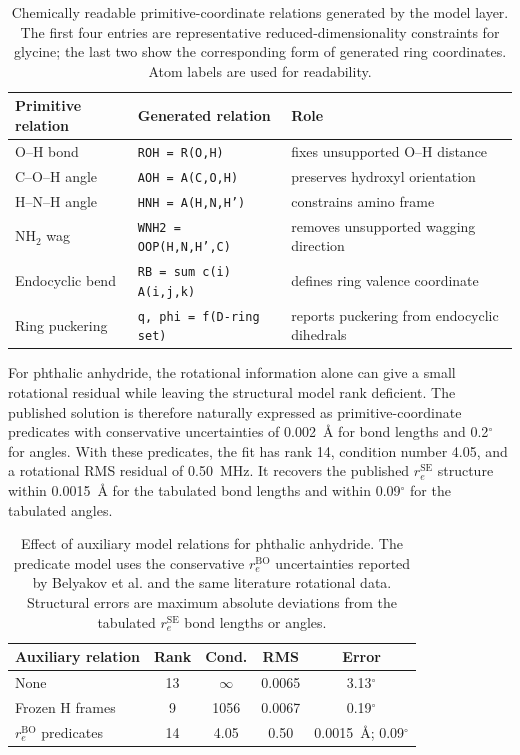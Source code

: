 \documentclass[aip,jcp,reprint,longbibliography,floatfix]{revtex4-2}
\begin{document}
\begin{table}[t]
\caption{Chemically readable primitive-coordinate relations generated by the
model layer. The first four entries are representative reduced-dimensionality
constraints for glycine; the last two show the corresponding form of generated
ring coordinates. Atom labels are used for readability.}
\label{tab:generated-relation-example}
\scriptsize
\setlength{\tabcolsep}{4pt}
\begin{tabular}{@{}lll@{}}
\toprule
Primitive relation & Generated relation & Role \\
\midrule
O--H bond & \texttt{ROH = R(O,H)} & fixes unsupported O--H distance \\
C--O--H angle & \texttt{AOH = A(C,O,H)} & preserves hydroxyl orientation \\
H--N--H angle & \texttt{HNH = A(H,N,H')} & constrains amino frame \\
NH$_2$ wag & \texttt{WNH2 = OOP(H,N,H',C)} & removes unsupported wagging direction \\
Endocyclic bend & \texttt{RB = sum c(i) A(i,j,k)} & defines ring valence coordinate \\
Ring puckering & \texttt{q, phi = f(D-ring set)} & reports puckering from endocyclic dihedrals \\
\bottomrule
\end{tabular}
\end{table}

For phthalic anhydride, the rotational information alone can give a small
rotational residual while leaving the structural model rank deficient. The
published solution is therefore naturally expressed as primitive-coordinate
predicates with conservative uncertainties of 0.002~\AA{} for bond lengths and
0.2$^\circ$ for angles. With these predicates, the fit has
rank 14, condition number 4.05, and a rotational RMS residual of 0.50~MHz. It
recovers the published $r_e^\mathrm{SE}$ structure within 0.0015~\AA{} for the
tabulated bond lengths and within 0.09$^\circ$ for the tabulated angles.

\begin{table}[t]
\caption{Effect of auxiliary model relations for phthalic anhydride. The
predicate model uses the conservative $r_e^\mathrm{BO}$ uncertainties reported
by Belyakov et al. and the same literature rotational data. Structural errors are 
maximum absolute deviations from the tabulated $r_e^\mathrm{SE}$ bond lengths or angles.}
\label{tab:phthalic-predicates}
\scriptsize
\setlength{\tabcolsep}{2.5pt}
\begin{tabular}{lcccc}
\toprule
Auxiliary relation & Rank & Cond. & RMS & Error \\
\midrule
None & 13 & $\infty$ & 0.0065 & 3.13$^\circ$ \\
Frozen H frames & 9 & 1056 & 0.0067 & 0.19$^\circ$ \\
$r_e^\mathrm{BO}$ predicates & 14 & 4.05 & 0.50 & 0.0015~\AA; 0.09$^\circ$ \\
\bottomrule
\end{tabular}
\end{table}
\end{document}
